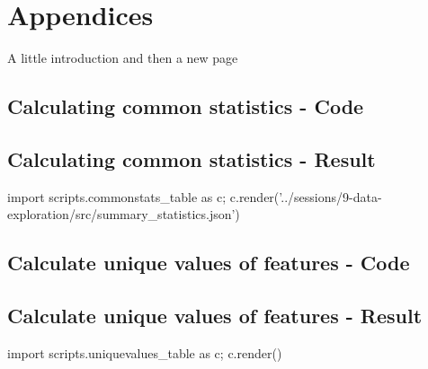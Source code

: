 \chapter{Appendices}
A little introduction and then a new page
\pagebreak

\section{Calculating common statistics - Code}\label{app:source-common-statistics}



\pagebreak

\section{Calculating common statistics - Result}\label{app:result-common-statistics}
{\small\sffamily
\begin{python}
    import scripts.commonstats_table as c; c.render('../sessions/9-data-exploration/src/summary_statistics.json')
\end{python}
}

\clearpage

\section{Calculate unique values of features - Code} %
\label{app:source-unique-values}




\clearpage

\section{Calculate unique values of features - Result} %
\label{app:result-unique-values}
{\small\sffamily
\begin{python}
    import scripts.uniquevalues_table as c; c.render()
\end{python}
}
